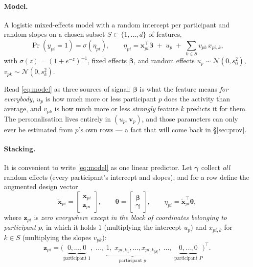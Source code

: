 \documentclass[11pt]{article}
\newcommand{\bb}{\bm{\beta}}
\newcommand{\bu}{\bm{\gamma}}
\newcommand{\bt}{\bm{\theta}}
\newcommand{\bx}{\bm{x}}
\newcommand{\bz}{\bm{z}}
\begin{document}
\paragraph{Model.} A logistic mixed-effects model with a random intercept per participant and
random slopes on a chosen subset $S\subset\{1,\dots,d\}$ of features,
\begin{equation}
  \Pr(y_{pi}=1) = \sigma(\eta_{pi}), \qquad
  \eta_{pi} = \bx_{pi}^{\!\top}\bb \;+\; u_{p} \;+\; \sum_{k\in S} v_{pk}\,x_{pi,k},
  \label{eq:model}
\end{equation}
with $\sigma(z)=(1+e^{-z})^{-1}$, fixed effects $\bb$, and random effects
$u_p \sim \mathcal{N}(0,s_0^2)$, $v_{pk}\sim\mathcal{N}(0,s_k^2)$.

Read \eqref{eq:model} as three sources of signal: $\bb$ is what the feature means
\emph{for everybody}, $u_p$ is how much more or less participant $p$ does the activity than
average, and $v_{pk}$ is how much more or less \emph{strongly} feature $k$ predicts it for them.
The personalisation lives entirely in $(u_p, \bm{v}_p)$, and those parameters can only ever be
estimated from $p$'s own rows --- a fact that will come back in \S\ref{sec:prov}.

\paragraph{Stacking.} It is convenient to write \eqref{eq:model} as one linear predictor. Let
$\bu$ collect \emph{all} random effects (every participant's intercept and slopes), and for a row
define the augmented design vector
\begin{equation}
  \tilde{\bx}_{pi} = \begin{bmatrix} \bx_{pi} \\ \bz_{pi} \end{bmatrix},
  \qquad
  \bt = \begin{bmatrix} \bb \\ \bu \end{bmatrix},
  \qquad
  \eta_{pi} = \tilde{\bx}_{pi}^{\!\top}\bt ,
  \label{eq:stack}
\end{equation}
where $\bz_{pi}$ is \emph{zero everywhere except in the block of coordinates belonging to
participant $p$}, in which it holds $1$ (multiplying the intercept $u_p$) and $x_{pi,k}$ for
$k\in S$ (multiplying the slopes $v_{pk}$):
\begin{equation}
  \bz_{pi} = \big(\underbrace{0,\dots,0}_{\text{participant }1},\;\dots,\;
                  \underbrace{1,\; x_{pi,k_1},\dots,x_{pi,k_{|S|}}}_{\text{participant }p},\;
                  \dots,\;\underbrace{0,\dots,0}_{\text{participant }P}\big)^{\!\top}.
  \label{eq:zdef}
\end{equation}
\end{document}
